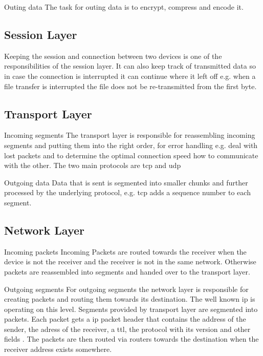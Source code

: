 Outing data\newline
The task for outing data is to encrypt, compress and encode it.

\subsection{Session Layer}
Keeping the session and connection between two devices is one of the responsibilities of the session layer. It can also keep track of transmitted data so in case the connection is interrupted it can continue where it left off e.g. when a file transfer is interrupted the file does not be re-transmitted from the first byte. 

\subsection{Transport Layer}
Incoming segments\newline
The transport layer is responsible for reassembling incoming segments and putting them into the right order, for error handling e.g. deal with lost packets and to determine the optimal connection speed how to communicate with the other. 
The two main protocols are \gls{tcp} and \gls{udp}

Outgoing data\newline
Data that is sent is segmented into smaller chunks and further processed by the underlying protocol, e.g. \gls{tcp} adds a sequence number to each segment.

\subsection{Network Layer}
Incoming packets\newline
Incoming Packets are routed towards the receiver when the device is not the receiver and the receiver is not in the same network. Otherwise packets are  reassembled into segments and handed over to the transport layer.

Outgoing segments\newline
For outgoing segments the network layer is responsible for creating packets and routing them towards its destination.
The well known \gls{ip} is operating on this level. Segments provided by transport layer  are segmented into packets. Each packet gets a \gls{ip} packet header that contains the address of the sender, the adress of the receiver, a \gls{ttl}, the protocol with its version and other fields \cite{rfc791-ip}. The packets are then routed via routers towards the destination when the receiver address exists somewhere.

